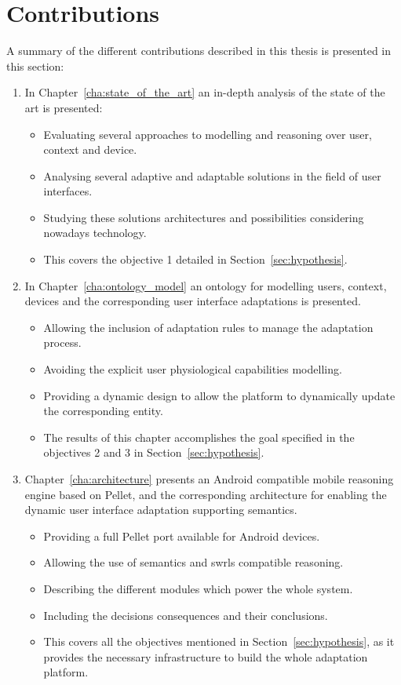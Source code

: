 \section{Contributions}
\label{sec:contributions}

A summary of the different contributions described in this thesis is presented 
in this section: 

\begin{enumerate}[label=\alph*)]
  \item In Chapter~\ref{cha:state_of_the_art} an in-depth analysis of the state 
  of the art is presented:
  \begin{itemize}
    \item Evaluating several approaches to modelling and reasoning over user,
    context and device.
    \item Analysing several adaptive and adaptable solutions in the field of
    user interfaces.
    \item Studying these solutions architectures and possibilities considering
    nowadays technology.
    \item This covers the objective 1 detailed in Section~\ref{sec:hypothesis}.
  \end{itemize}
  
  \item In Chapter~\ref{cha:ontology_model} an ontology for modelling users, 
  context, devices and the corresponding user interface adaptations is presented.
  \begin{itemize}
    \item Allowing the inclusion of adaptation rules to manage the adaptation 
    process.
    \item Avoiding the explicit user physiological capabilities modelling.
    \item Providing a dynamic design to allow the platform to dynamically update
    the corresponding entity.
    \item The results of this chapter accomplishes the goal specified in the
    objectives 2 and 3 in Section~\ref{sec:hypothesis}.
  \end{itemize}

  \item Chapter~\ref{cha:architecture} presents an Android compatible mobile 
  reasoning engine based on Pellet, and the corresponding architecture
  for enabling the dynamic user interface adaptation supporting semantics.
  \begin{itemize}
    \item Providing a full Pellet port available for Android devices.
    \item Allowing the use of semantics and \acp{swrl} compatible reasoning.
    \item Describing the different modules which power the whole system.
    \item Including the decisions consequences and their conclusions.
    \item This covers all the objectives mentioned in Section~\ref{sec:hypothesis},
    as it provides the necessary infrastructure to build the whole adaptation
    platform.
  \end{itemize}


\end{enumerate}
